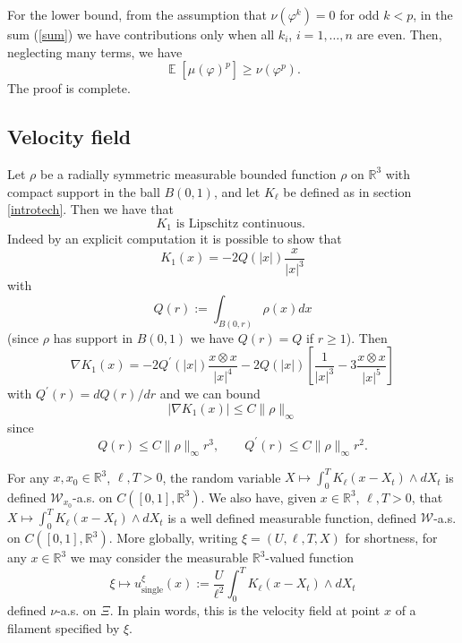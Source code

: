 \documentclass[a4paper,12pt]{article}
\DeclareMathOperator{\expect}{{\mathbb E}}
\begin{document}
For the lower bound, from the assumption that $\nu(\varphi^{k})=0$ for odd
$k<p$, in the sum (\ref{sum}) we have contributions only when all $k_{i}$,
$i=1,\dots,n$ are even. Then, neglecting many terms, we have
\[
\expect[ \mu(\varphi)^p ]\geq\nu(\varphi^{p}).
\]
The proof is complete.

\subsection{Velocity field}

Let $\rho$ be a radially symmetric measurable bounded function $\rho$ on
$\mathbb{R}^{3}$ with compact support in the ball $B(0,1)$, and let $K_{\ell}$
be defined as in section \ref{introtech}. Then we have that
\begin{equation}
K_{1}\text{ is Lipschitz continuous. } \label{lip}%
\end{equation}
Indeed by an explicit computation it is possible to show that
\[
K_{1}(x) = - 2 Q(|x|) \frac{x}{|x|^{3}}
\]
with
\[
Q(r) := \int_{B(0,r)} \rho(x) dx
\]
(since $\rho$ has support in $B(0,1)$ we have $Q(r) = Q$ if $r \ge1$). Then
\[
\nabla K_{1}(x) = - 2 Q^{\prime}(|x|) \frac{x \otimes x}{|x|^{4}} - 2 Q(|x|)
\left[  \frac{1}{|x|^{3}}-3\frac{x\otimes x}{|x|^{5}}\right]
\]
with $Q^{\prime}(r) = dQ(r)/dr$ and we can bound
\[
|\nabla K_{1}(x)| \le C \|\rho\|_{\infty}%
\]
since
\[
Q(r) \le C \|\rho\|_{\infty}r^{3}, \qquad Q^{\prime}(r) \le C \|\rho
\|_{\infty}r^{2}.
\]

\medskip
%
%
%

For any $x,x_{0}\in\mathbb{R}^{3}$, $\ell,T>0$, the random variable
$X\mapsto\int_{0}^{T}K_{\ell}(x-X_{t})\wedge dX_{t}$ is defined $\mathcal{W}%
_{x_{0}}$-a.s. on $C([0,1],\mathbb{R}^{3})$. We also have, given
$x\in\mathbb{R}^{3}$, $\ell,T>0$, that $X\mapsto\int_{0}^{T}K_{\ell}%
(x-X_{t})\wedge dX_{t}$ is a well defined measurable function, defined
$\mathcal{W}$-a.s. on $C([0,1],\mathbb{R}^{3})$. More globally, writing
$\xi=(U,\ell,T,X)$ for shortness, for any $x\in\mathbb{R}^{3}$ we may consider
the measurable $\mathbb{R}^{3}$-valued function
\[
\xi\mapsto u_{\text{single}}^{\xi}\left(  x\right)  :=\frac{U}{\ell^{2}}%
\int_{0}^{T}K_{\ell}(x-X_{t})\wedge dX_{t}%
\]
defined $\mathcal{\nu}$-a.s. on $\Xi$. In plain words, this is the velocity
field at point $x$ of a filament specified by $\xi$.
\end{document}
